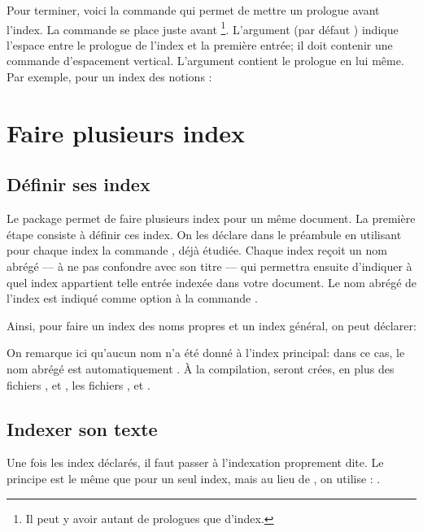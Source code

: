 Pour terminer, voici la commande  qui permet de mettre un prologue avant l'index. La commande se place juste avant \footnote{Il peut y avoir autant de prologues que d'index.}. L'argument  (par défaut ) indique l'espace   entre le prologue de l'index et la première entrée; il doit contenir  une commande d'espacement vertical. L'argument  contient le prologue en lui même. Par exemple, pour un index des notions :

\begin{latexcode}
\printindex
\end{latexcode}


\section{Faire plusieurs index}\label{multiindex}


\subsection{Définir ses index}

Le package  permet de faire plusieurs index pour un même document. La première étape consiste à définir ces index. On les déclare dans le préambule en utilisant pour chaque index la commande , déjà étudiée. Chaque index reçoit un nom  abrégé --- à ne pas confondre avec son titre --- qui permettra ensuite d'indiquer  à quel index appartient telle entrée indexée dans votre document. Le nom abrégé de l'index est indiqué comme  option à la commande  .


Ainsi, pour faire un index des noms propres et un index général, on peut déclarer:

\begin{latexcode}
\makeindex[title=Index principal]
\makeindex[name=npr, title=Index des noms propres] 
\end{latexcode}

On remarque ici qu'aucun nom n'a été donné à l'index principal: dans ce cas, le nom abrégé est automatiquement . À la compilation, seront crées, en plus  des fichiers ,  et ,  les fichiers ,  et .


\subsection{Indexer son texte}
Une fois  les index déclarés, il faut passer à l'indexation proprement dite. Le principe est le même que pour un seul index,
mais au lieu de , on utilise : 
. 

